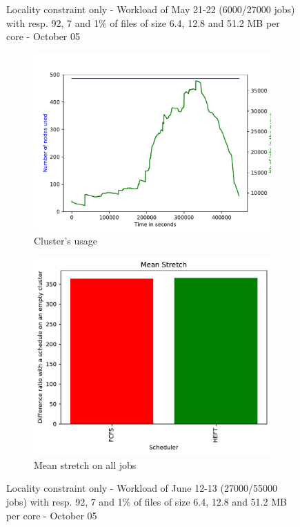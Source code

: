 \documentclass[a4paper]{article}
\begin{document}
\begin{figure}[H]
\caption{Locality constraint only - Workload of May 21-22 (6000/27000 jobs) with resp. 92, 7 and 1\% of files of size 6.4, 12.8 and 51.2 MB per core - October 05}\end{figure}

\begin{figure}[H]\centering
\begin{subfigure}[b]{0.4\linewidth}\centering\includegraphics[width=1\linewidth]{MBSS/plot/2022-06-12->2022-06-13_V9271_Fcfs_Used_nodes_450_128_32_256_4_1024.pdf}\caption{Cluster's usage}\end{subfigure}
\begin{subfigure}[b]{0.4\linewidth}\centering\includegraphics[width=0.9\linewidth]{MBSS/plot/Results_FCFS_Score_Adaptative_Multiplier_2022-06-12->2022-06-13_V9271_Mean_Stretch_450_128_32_256_4_1024.pdf}\caption{Mean stretch on all jobs}\end{subfigure}
\caption{Locality constraint only - Workload of June 12-13 (27000/55000 jobs) with resp. 92, 7 and 1\% of files of size 6.4, 12.8 and 51.2 MB per core - October 05}\end{figure}
\end{document}
